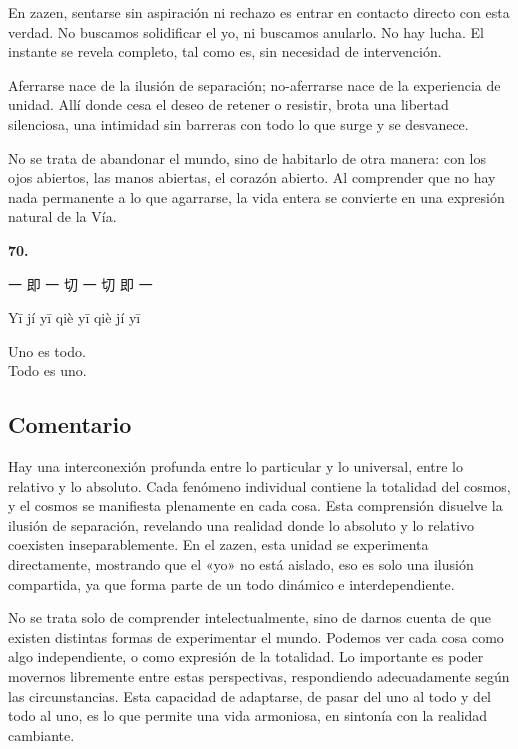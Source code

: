 \documentclass[
  a5paperpaper,
]{article}
\begin{document}
En zazen, sentarse sin aspiración ni rechazo es entrar en contacto
directo con esta verdad. No buscamos solidificar el yo, ni buscamos
anularlo. No hay lucha. El instante se revela completo, tal como es, sin
necesidad de intervención.

Aferrarse nace de la ilusión de separación; no-aferrarse nace de la
experiencia de unidad. Allí donde cesa el deseo de retener o resistir,
brota una libertad silenciosa, una intimidad sin barreras con todo lo
que surge y se desvanece.

No se trata de abandonar el mundo, sino de habitarlo de otra manera: con
los ojos abiertos, las manos abiertas, el corazón abierto. Al comprender
que no hay nada permanente a lo que agarrarse, la vida entera se
convierte en una expresión natural de la Vía.

\hfill\break

\hypertarget{05}{}
\begin{verseblock}

\newpage

\begin{center}\textbf{70.}\end{center}

一 即 一 切 一 切 即 一

Yī jí yī qiè yī qiè jí yī

Uno es todo.\\
Todo es uno.

\end{verseblock}

\hfill\break

\hypertarget{comentario-69}{%
\subsection{Comentario}\label{comentario-69}}

Hay una interconexión profunda entre lo particular y lo universal, entre
lo relativo y lo absoluto. Cada fenómeno individual contiene la
totalidad del cosmos, y el cosmos se manifiesta plenamente en cada cosa.
Esta comprensión disuelve la ilusión de separación, revelando una
realidad donde lo absoluto y lo relativo coexisten inseparablemente. En
el zazen, esta unidad se experimenta directamente, mostrando que el «yo»
no está aislado, eso es solo una ilusión compartida, ya que forma parte
de un todo dinámico e interdependiente.

No se trata solo de comprender intelectualmente, sino de darnos cuenta
de que existen distintas formas de experimentar el mundo. Podemos ver
cada cosa como algo independiente, o como expresión de la totalidad. Lo
importante es poder movernos libremente entre estas perspectivas,
respondiendo adecuadamente según las circunstancias. Esta capacidad de
adaptarse, de pasar del uno al todo y del todo al uno, es lo que permite
una vida armoniosa, en sintonía con la realidad cambiante.
\end{document}

